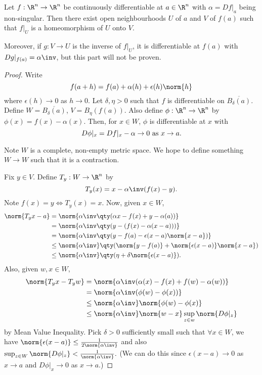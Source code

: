 \begin{theorem} \label{thm:2.16}
Let $f: \R^n\to \R^n$ be continuously differentiable at $a \in \R^n$ with $\alpha = Df|_a$ being non-singular.
Then there exist open neighbourhoods $U$ of $a$ and $V$ of $f(a)$ such that $f|_U$ is a homeomorphism of $U$ onto $V$.

Moreover, if $g: V\to U$ is the inverse of $f|_U$, it is differentiable at $f(a)$ with $Dg|_{f(a)} = \alpha\inv$, but this part will not be proven.
\end{theorem}

\begin{proof}
Write \[f(a+h) = f(a) + \alpha(h) +\epsilon(h) \norm{h} \] where $\epsilon(h)\to 0$ as $h\to 0$. Let $\delta,\eta >0$ such that $f$ is differentiable on $\overline{B_\delta(a)}$. Define $W = \overline{B_\delta(a)}$, $V = B_\eta(f(a))$. Also define $\phi: \R^n\to \R^n$ by $\phi(x) = f(x) - \alpha(x)$. Then, for $x\in W$, $\phi$ is differentiable at $x$ with \[D\phi|_x = Df|_x - \alpha \to 0 \textup{ as } x\to a.\]

Note $W$ is a complete, non-empty metric space. We hope to define something $W\to W$ such that it is a contraction.

Fix $y\in V$. Define $T_y: W\to \R^n$ by \[T_y(x) = x-\alpha\inv(f(x) - y).\] Note $f(x) = y\Leftrightarrow T_y(x) = x$. Now, given $x\in W$,
\begin{align*}
    \norm{T_yx - a} &= \norm{\alpha\inv \qty( \alpha x - f(x) + y - \alpha(a) )} \\
    &= \norm{\alpha\inv \qty( y - (f(x) - \alpha(x-a)) )} \\
    &= \norm{\alpha\inv \qty( y -f(a) - \epsilon(x-a)\norm{x-a} )} \\
    &\leq \norm{\alpha\inv} \qty( \norm{y-f(a)} + \norm{\epsilon(x-a)}\norm{x-a} ) \\
    &\leq \norm{\alpha\inv} \qty(\eta + \delta\norm{\epsilon(x-a)}).
\end{align*}
Also, given $w,x\in W$,
\begin{align*}
    \norm{T_yx - T_yw} &= \norm{\alpha\inv (\alpha(x) - f(x) + f(w) - \alpha(w))}\\
    &= \norm{\alpha\inv (\phi(w) - \phi(x))}\\
    &\leq \norm{\alpha\inv} \norm{\phi(w) - \phi(x)}\\
    &\leq \norm{\alpha\inv}\norm{w-x}\sup_{z\in w}\norm{D\phi|_z}
\end{align*}
by Mean Value Inequality. Pick $\delta>0$ sufficiently small such that $\forall x\in W$, we have $\norm{\epsilon(x-a)}\leq \frac{1}{2\norm{\alpha\inv}}$ and also $\sup_{z\in W}\norm{D\phi|_z} < \frac{1}{\norm{\alpha\inv}}.$ (We can do this since $\epsilon(x-a)\to 0$ as $x\to a$ and $D\phi|_x \to 0$ as $x\to a$.)


\end{proof}

